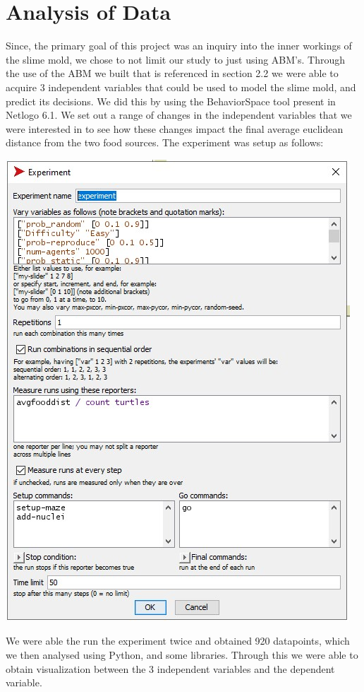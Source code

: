 \documentclass[a4paper, 11pt]{article}
\begin{document}
\section{Analysis of Data}
Since, the primary goal of this project was an inquiry into the inner workings of the slime mold, we chose to not limit our study to just using ABM's. Through the use of the ABM we built that is referenced in section 2.2 we were able to acquire 3 independent variables that could be used to model the slime mold, and predict its decisions. We did this by using the BehaviorSpace tool present in Netlogo 6.1. We set out a range of changes in the independent variables that we were interested in to see how these changes impact the final average euclidean distance from the two food sources. The experiment was setup as follows: 
\begin{center}
    \includegraphics[scale=0.7]{Images/behaviorspace.jpg}
\end{center}
We were able the run the experiment twice and obtained 920 datapoints, which we then analysed using Python, and some libraries. Through this we were able to obtain visualization between the 3 independent variables and the dependent variable.
\end{document}
